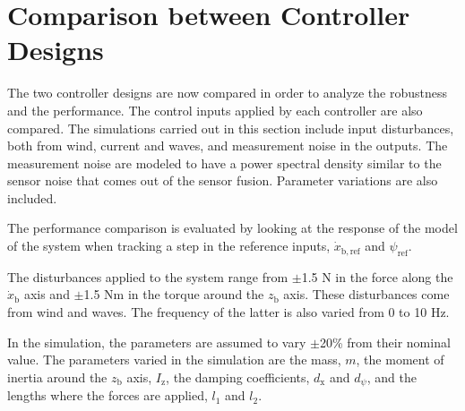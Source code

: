 \section{Comparison between Controller Designs}\label{sec:comparison}
The two controller designs are now compared in order to analyze the robustness and the performance. The control inputs applied by each controller are also compared. The simulations carried out in this section include input disturbances, both from wind, current and waves, and measurement noise in the outputs. The measurement noise are modeled to have a power spectral density similar to the sensor noise that comes out of the sensor fusion. Parameter variations are also included.

The performance comparison is evaluated by looking at the response of the model of the system when tracking a step in the reference inputs, $\dot{x}_\mathrm{b,ref}$ and $\psi_\mathrm{ref}$. 

The disturbances applied to the system range from $\pm$\num{1.5} N in the force along the $\dot{x}_\mathrm{b}$ axis and $\pm$\num{1.5} Nm in the torque around the $z_\mathrm{b}$ axis. These disturbances come from wind and waves. The frequency of the latter is also varied from 0 to 10 Hz.

In the simulation, the parameters are assumed to vary $\pm$20\% from their nominal value. The parameters varied in the simulation are the mass, $m$, the moment of inertia around the $z_\mathrm{b}$ axis, $I_\mathrm{z}$, the damping coefficients, $d_\mathrm{x}$ and $d_\psi$, and the lengths where the forces are applied, $l_1$ and $l_2$. 

